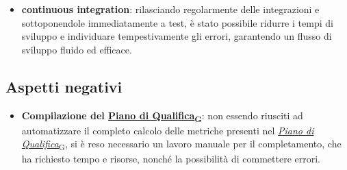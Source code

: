 \begin{itemize}
    \item \textbf{continuous integration}: rilasciando regolarmente delle integrazioni e sottoponendole immediatamente a test, è stato possibile ridurre i tempi di sviluppo e individuare tempestivamente gli errori, garantendo un flusso di sviluppo fluido ed efficace.
\end{itemize}

\subsection{Aspetti negativi}
\begin{itemize}
    \item \textbf{Compilazione del \href{https://7last.github.io/docs/pb/documentazione-interna/glossario\#piano-di-qualifica}{Piano di Qualifica\textsubscript{G}}}: non essendo riusciti ad automatizzare il completo calcolo delle metriche presenti nel \href{https://7last.github.io/docs/pb/documentazione-interna/glossario\#piano-di-qualifica}{\textit{Piano di Qualifica}\textsubscript{G}}, si è reso necessario un lavoro manuale per il completamento, che ha richiesto tempo e risorse, nonché la possibilità di commettere errori.
\end{itemize}